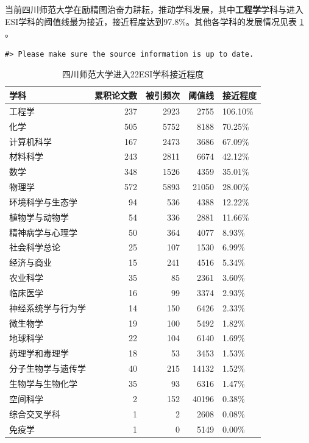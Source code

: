 \documentclass[cn, 11pt, fancy, hide]{elegantbook}
\begin{document}
当前四川师范大学在励精图治奋力耕耘，推动学科发展，其中\textbf{工程学}学科与进入ESI学科的阈值线最为接近，接近程度达到97.8\%。其他各学科的发展情况见表 \ref{tab:iris} 。

\begin{verbatim}
#> Please make sure the source information is up to date.
\end{verbatim}

\begin{table}[!h]

\caption{\label{tab:iris}四川师范大学进入22ESI学科接近程度}
\centering
\begin{tabular}[t]{lrrrl}
\toprule
学科 & 累积论文数 & 被引频次 & 阈值线 & 接近程度\\
\midrule
工程学 & 237 & 2923 & 2755 & 106.10\%\\
化学 & 505 & 5752 & 8188 & 70.25\%\\
计算机科学 & 167 & 2473 & 3686 & 67.09\%\\
材料科学 & 243 & 2811 & 6674 & 42.12\%\\
数学 & 348 & 1526 & 4359 & 35.01\%\\
\addlinespace
物理学 & 572 & 5893 & 21050 & 28.00\%\\
环境科学与生态学 & 94 & 536 & 4388 & 12.22\%\\
植物学与动物学 & 54 & 336 & 2881 & 11.66\%\\
精神病学与心理学 & 50 & 364 & 4077 & 8.93\%\\
社会科学总论 & 25 & 107 & 1530 & 6.99\%\\
\addlinespace
经济与商业 & 15 & 241 & 4516 & 5.34\%\\
农业科学 & 35 & 85 & 2361 & 3.60\%\\
临床医学 & 16 & 99 & 3374 & 2.93\%\\
神经系统学与行为学 & 14 & 150 & 6426 & 2.33\%\\
微生物学 & 19 & 100 & 5492 & 1.82\%\\
\addlinespace
地球科学 & 22 & 104 & 6140 & 1.69\%\\
药理学和毒理学 & 18 & 53 & 3453 & 1.53\%\\
分子生物学与遗传学 & 40 & 215 & 14132 & 1.52\%\\
生物学与生物化学 & 35 & 93 & 6316 & 1.47\%\\
空间科学 & 2 & 152 & 40196 & 0.38\%\\
\addlinespace
综合交叉学科 & 1 & 2 & 2608 & 0.08\%\\
免疫学 & 1 & 0 & 5149 & 0.00\%\\
\bottomrule
\end{tabular}
\end{table}
\end{document}
